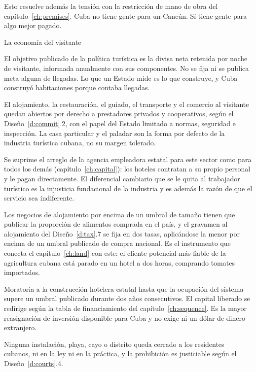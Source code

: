 Esto resuelve además la tensión con la restricción de mano de obra del
capítulo~\ref{ch:premises}. Cuba no tiene gente para un Cancún. Sí tiene gente para algo
mejor pagado.

\begin{design}{La economía del visitante}
\label{d:visitor}
\begin{rules}
 El objetivo publicado de la política turística es la divisa neta
retenida por noche de visitante, informada anualmente con sus componentes. No se fija ni
se publica meta alguna de llegadas. Lo que un Estado mide es lo que construye, y Cuba
construyó habitaciones porque contaba llegadas.

 El alojamiento, la restauración, el guiado, el transporte y el
comercio al visitante quedan abiertos por derecho a prestadores privados y cooperativos,
según el Diseño~\ref{d:commit}.2, con el papel del Estado limitado a normas, seguridad e
inspección. La casa particular y el paladar son la forma por defecto de la industria
turística cubana, no su margen tolerado.

 Se suprime el arreglo de la agencia empleadora estatal para
este sector como para todos los demás (capítulo~\ref{ch:capital}): los hoteles contratan a
su propio personal y le pagan directamente. El diferencial cambiario que se le quita al
trabajador turístico es la injusticia fundacional de la industria y es además la razón de
que el servicio sea indiferente.

 Los negocios de alojamiento por encima de un umbral de tamaño tienen
que publicar la proporción de alimentos comprada en el país, y el gravamen al alojamiento
del Diseño~\ref{d:tax}.7 se fija en dos tasas, aplicándose la menor por encima de un umbral
publicado de compra nacional. Es el instrumento que conecta el capítulo~\ref{ch:land} con
este: el cliente potencial más fiable de la agricultura cubana está parado en un hotel a
dos horas, comprando tomates importados.

 Moratoria a la construcción hotelera estatal hasta que
la ocupación del sistema supere un umbral publicado durante dos años consecutivos. El
capital liberado se redirige según la tabla de financiamiento del
capítulo~\ref{ch:sequence}. Es la mayor reasignación de inversión disponible para Cuba y no
exige ni un dólar de dinero extranjero.

 Ninguna instalación, playa, cayo o distrito queda cerrado a
los residentes cubanos, ni en la ley ni en la práctica, y la prohibición es justiciable
según el Diseño~\ref{d:courts}.4.
\end{rules}
\end{design}

